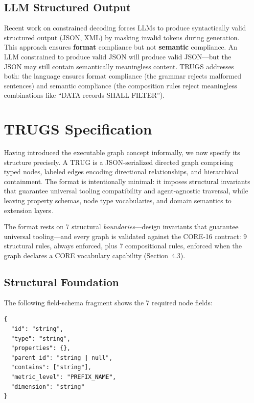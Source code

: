 \documentclass{article}
\begin{document}
\subsection{LLM Structured Output}

Recent work on constrained decoding \citep{willard2023efficient, tam2025slot} forces LLMs to produce syntactically valid structured output (JSON, XML) by masking invalid tokens during generation. This approach ensures \textbf{format} compliance but not \textbf{semantic} compliance. An LLM constrained to produce valid JSON will produce valid JSON---but the JSON may still contain semantically meaningless content. TRUGS addresses both: the language ensures format compliance (the grammar rejects malformed sentences) and semantic compliance (the composition rules reject meaningless combinations like ``DATA records SHALL FILTER'').

\section{TRUGS Specification}

Having introduced the executable graph concept informally, we now specify its structure precisely. A TRUG is a JSON-serialized directed graph comprising typed nodes, labeled edges encoding directional relationships, and hierarchical containment. The format is intentionally minimal: it imposes structural invariants that guarantee universal tooling compatibility and agent-agnostic traversal, while leaving property schemas, node type vocabularies, and domain semantics to extension layers.

The format rests on 7 structural \emph{boundaries}---design invariants that guarantee universal tooling---and every graph is validated against the CORE-16 contract: 9 structural rules, always enforced, plus 7 compositional rules, enforced when the graph declares a CORE vocabulary capability (Section~4.3).

\subsection{Structural Foundation}

The following field-schema fragment shows the 7 required node fields:

\begin{lstlisting}[style=jsonfragment]
{
  "id": "string",
  "type": "string",
  "properties": {},
  "parent_id": "string | null",
  "contains": ["string"],
  "metric_level": "PREFIX_NAME",
  "dimension": "string"
}
\end{lstlisting}
\end{document}
